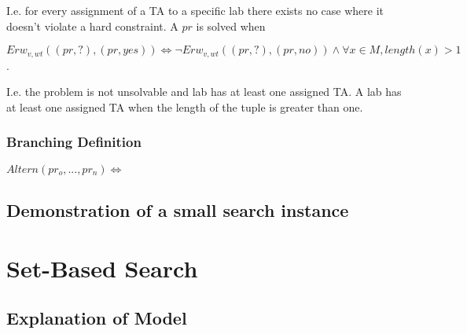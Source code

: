 \documentclass{article}
\begin{document}
I.e. for every assignment of a TA to a specific lab there exists no
case where it doesn't violate a hard constraint. A $pr$ is solved when\\

\begin{center}
  $Erw_{v,wt}((pr, ?),(pr, yes)) \iff \lnot Erw_{v,wt}((pr, ?),(pr,
  no)) \land \forall x \in M, length(x) > 1$.
\end{center}

I.e. the problem is not unsolvable and lab has at least one assigned
TA. A lab has at least one assigned TA when the length of the tuple is
greater than one.

\subsubsection{Branching Definition}

$Altern(pr_o, ..., pr_n) \iff $

\subsection{Demonstration of a small search instance}

















































\section{Set-Based Search}

\subsection{Explanation of Model}
\end{document}

